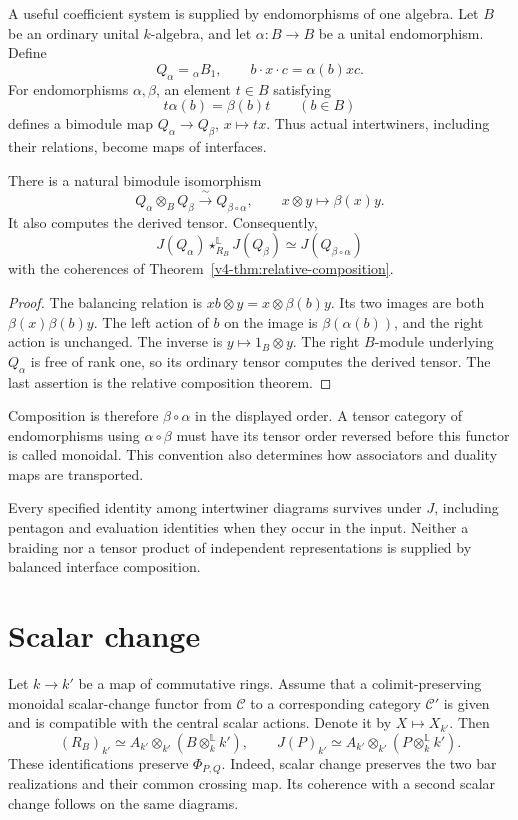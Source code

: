 A useful coefficient system is supplied by endomorphisms
of one algebra. Let \(B\) be an ordinary unital
\(k\)-algebra, and let \(\alpha:B\to B\) be a unital
endomorphism. Define
\[
 Q_\alpha={}_\alpha B_1,
 \qquad b\cdot x\cdot c=\alpha(b)xc.
\]
For endomorphisms \(\alpha,\beta\), an element \(t\in B\)
satisfying
\[
 t\alpha(b)=\beta(b)t\qquad(b\in B)
\]
defines a bimodule map \(Q_\alpha\to Q_\beta\),
\(x\mapsto tx\). Thus actual intertwiners, including their
relations, become maps of interfaces.

\begin{proposition}\label{v4-prop:endomorphism-composition}
There is a natural bimodule isomorphism
\[
 Q_\alpha\otimes_BQ_\beta
       \xrightarrow{\ \sim\ }Q_{\beta\circ\alpha},
 \qquad x\otimes y\longmapsto\beta(x)y.
\]
It also computes the derived tensor. Consequently,
\[
 J(Q_\alpha)\star_{R_B}^{\mathbb L}J(Q_\beta)
       \simeq J(Q_{\beta\circ\alpha})
\]
with the coherences of
Theorem~\ref{v4-thm:relative-composition}.
\end{proposition}

\begin{proof}
The balancing relation is
\(xb\otimes y=x\otimes\beta(b)y\).
Its two images are both \(\beta(x)\beta(b)y\).
The left action of \(b\) on the image is
\(\beta(\alpha(b))\), and the right action is unchanged.
The inverse is \(y\mapsto1_B\otimes y\).
The right \(B\)-module underlying \(Q_\alpha\) is free
of rank one, so its ordinary tensor computes the
derived tensor. The last assertion is the relative
composition theorem.
\end{proof}

Composition is therefore \(\beta\circ\alpha\) in the
displayed order. A tensor category of endomorphisms using
\(\alpha\circ\beta\) must have its tensor order reversed
before this functor is called monoidal. This convention
also determines how associators and duality maps are
transported.

Every specified identity among intertwiner diagrams
survives under \(J\), including pentagon and evaluation
identities when they occur in the input. Neither a
braiding nor a tensor product of independent
representations is supplied by balanced interface
composition.

\section{Scalar change}
\label{v4-sec:relative-scalar-change}

Let \(k\to k'\) be a map of commutative rings.
Assume that a colimit-preserving monoidal scalar-change
functor from \(\mathcal C\) to a corresponding category
\(\mathcal C'\) is given and is compatible with the
central scalar actions. Denote it by \(X\mapsto X_{k'}\).
Then
\[
 (R_B)_{k'}
   \simeq A_{k'}\otimes_{k'}
                (B\otimes_k^{\mathbb L}k'),
 \qquad
 J(P)_{k'}
   \simeq A_{k'}\otimes_{k'}
                (P\otimes_k^{\mathbb L}k').
\]
These identifications preserve \(\Phi_{P,Q}\).
Indeed, scalar change preserves the two bar realizations
and their common crossing map. Its coherence with a
second scalar change follows on the same diagrams.

